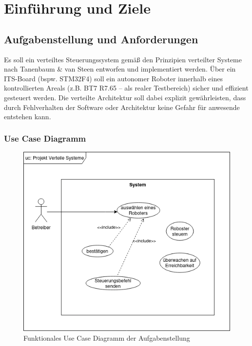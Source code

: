 \chapter{Einführung und Ziele}

\section{Aufgabenstellung und Anforderungen}

Es soll ein verteiltes Steuerungssystem gemäß den Prinzipien verteilter Systeme nach Tanenbaum \& van Steen entworfen und implementiert werden. Über ein ITS-Board (bspw. STM32F4) soll ein autonomer Roboter innerhalb eines kontrollierten Areals (z.B. BT7 R7.65 – als realer Testbereich) sicher und effizient gesteuert werden. Die verteilte Architektur soll dabei explizit gewährleisten, dass durch Fehlverhalten der Software oder Architektur keine Gefahr für anwesende entstehen kann.

\subsection*{Use Case Diagramm} %

\begin{figure}[h]
	\centering
	\includegraphics[scale=.5]{diagrams/use_case.png}
	\caption{Funktionales Use Case Diagramm der Aufgabenstellung}
	\label{fig:meine-grafik}
\end{figure}

